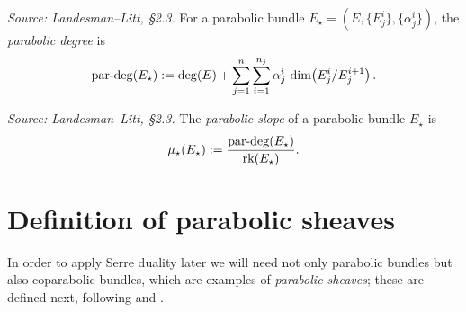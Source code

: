 \begin{definition}
  \label{def:par-degree}
  \textit{Source: Landesman--Litt, \S2.3.}
  For a parabolic bundle $E_\star = (E, \{E^i_j\}, \{\alpha^i_j\})$, the
  \emph{parabolic degree} is
  \[
    \operatorname{par\text{-}deg}(E_\star) := \deg(E) + \sum_{j=1}^n \sum_{i=1}^{n_j}
      \alpha^i_j \, \dim\!\left(E_j^i / E_j^{i+1}\right).
  \]
\end{definition}

\begin{definition}
  \label{def:par-slope}
  \textit{Source: Landesman--Litt, \S2.3.}
  The \emph{parabolic slope} of a parabolic bundle $E_\star$ is
  \[
    \mu_\star(E_\star) := \frac{\operatorname{par\text{-}deg}(E_\star)}{\operatorname{rk}(E_\star)} .
  \]
\end{definition}

\section{Definition of parabolic sheaves}
\label{sec:parabolic-sheaf}

In order to apply Serre duality later we will need not only parabolic bundles
but also coparabolic bundles, which are examples of \emph{parabolic sheaves};
these are defined next, following
\cite{yokogawa:infinitesimal-deformation} and
\cite{bodenY:moduli-spaces-of-parabolic-higgs-bundles}.

